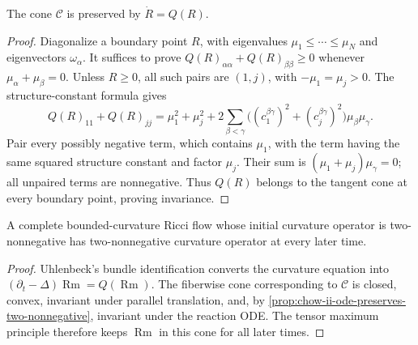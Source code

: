 \begin{proposition}
  \label{prop:chow-ii-ode-preserves-two-nonnegative}
  The cone \(\mathcal C\) is preserved by \(\dot R=Q(R)\).
\end{proposition}
\begin{proof}
  Diagonalize a boundary point \(R\), with eigenvalues
  \(\mu_1\le\cdots\le\mu_N\) and eigenvectors \(\omega_\alpha\).  It suffices
  to prove \(Q(R)_{\alpha\alpha}+Q(R)_{\beta\beta}\ge0\) whenever
  \(\mu_\alpha+\mu_\beta=0\).  Unless \(R\ge0\), all such pairs are
  \((1,j)\), with \(-\mu_1=\mu_j>0\).  The structure-constant formula gives
  \[
  Q(R)_{11}+Q(R)_{jj}=\mu_1^2+\mu_j^2+
  2\sum_{\beta<\gamma}\bigl((c_1^{\beta\gamma})^2+
  (c_j^{\beta\gamma})^2\bigr)\mu_\beta\mu_\gamma.
  \]
  Pair every possibly negative term, which contains \(\mu_1\), with the
  term having the same squared structure constant and factor \(\mu_j\).
  Their sum is \((\mu_1+\mu_j)\mu_\gamma=0\); all unpaired terms are
  nonnegative.  Thus \(Q(R)\) belongs to the tangent cone at every boundary
  point, proving invariance.
\end{proof}

\begin{proposition}
  \label{prop:chow-ii-ricci-flow-preserves-two-nonnegative}
  A complete bounded-curvature Ricci flow whose initial curvature operator is
  two-nonnegative has two-nonnegative curvature operator at every later time.
\end{proposition}
\begin{proof}
  Uhlenbeck's bundle identification converts the curvature equation into
  \((\partial_t-\Delta)\operatorname{Rm}=Q(\operatorname{Rm})\).  The fiberwise
  cone corresponding to \(\mathcal C\) is closed, convex, invariant under
  parallel translation, and, by
  \ref{prop:chow-ii-ode-preserves-two-nonnegative}, invariant under the
  reaction ODE.  The tensor maximum principle therefore keeps
  \(\operatorname{Rm}\) in this cone for all later times.
\end{proof}

